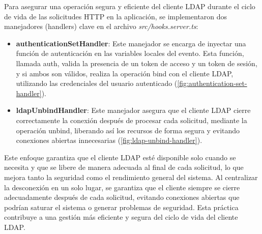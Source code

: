 Para asegurar una operación segura y eficiente del cliente LDAP durante el ciclo de vida de las solicitudes HTTP en la aplicación, se implementaron dos manejadores (handlers) clave en el archivo \textit{src/hooks.server.ts}:
\begin{itemize}
    \item \textbf{authenticationSetHandler}: Este manejador se encarga de inyectar una función de autenticación en las variables locales del evento. Esta función, llamada auth, valida la presencia de un token de acceso y un token de sesión, y si ambos son válidos, realiza la operación bind con el cliente LDAP, utilizando las credenciales del usuario autenticado (\autoref{fig:authentication-set-handler}).
    \item \textbf{ldapUnbindHandler}: Este manejador asegura que el cliente LDAP cierre correctamente la conexión después de procesar cada solicitud, mediante la operación unbind, liberando así los recursos de forma segura y evitando conexiones abiertas innecesarias (\autoref{fig:ldap-unbind-handler}).
\end{itemize}

Este enfoque garantiza que el cliente LDAP esté disponible solo cuando se necesita y que se libere de manera adecuada al final de cada solicitud, lo que mejora tanto la seguridad como el rendimiento general del sistema. Al centralizar la desconexión en un solo lugar, se garantiza que el cliente siempre se cierre adecuadamente después de cada solicitud, evitando conexiones abiertas que podrían saturar el sistema o generar problemas de seguridad. Esta práctica contribuye a una gestión más eficiente y segura del ciclo de vida del cliente LDAP.
